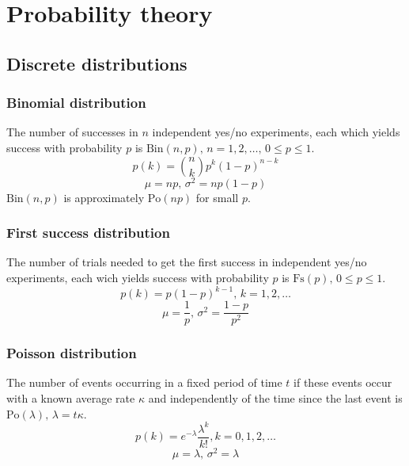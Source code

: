 \section{Probability theory}


\subsection{Discrete distributions}

\subsubsection{Binomial distribution}
The number of successes in $n$ independent yes/no experiments, each which yields success with probability $p$ is $\textrm{Bin}(n,p),\,n=1,2,\dots,\, 0\leq p\leq1$.
\[p(k)=\binom{n}{k}p^k(1-p)^{n-k}\]
\[\mu = np,\,\sigma^2=np(1-p)\]
$\textrm{Bin}(n,p)$ is approximately $\textrm{Po}(np)$ for small $p$.

\subsubsection{First success distribution}
The number of trials needed to get the first success in independent yes/no experiments, each wich yields success with probability $p$ is $\textrm{Fs}(p),\,0\leq p\leq1$.
\[p(k)=p(1-p)^{k-1},\,k=1,2,\dots\]
\[\mu = \frac1p,\,\sigma^2=\frac{1-p}{p^2}\]

\subsubsection{Poisson distribution}
The number of events occurring in a fixed period of time $t$ if these events occur with a known average rate $\kappa$ and independently of the time since the last event is $\textrm{Po}(\lambda),\,\lambda=t\kappa$.
\[p(k)=e^{-\lambda}\frac{\lambda^k}{k!}, k=0,1,2,\dots\]
\[\mu=\lambda,\,\sigma^2=\lambda\]


